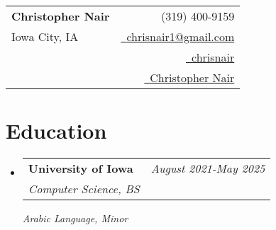 \documentclass[a4paper,11pt]{article}
\makeatletter
\newcommand{\resumeSubheading}[4]{
\vspace{0.5mm}\item
    \begin{tabular*}{0.98\textwidth}[t]{l@{\extracolsep{\fill}}r}
        \textbf{#1} & \textit{\footnotesize{#4}} \\
        \textit{\footnotesize{#3}} &  \footnotesize{#2}\\
    \end{tabular*}
    \vspace{-2.4mm}
}
\newcommand{\resumeSubHeadingListStart}{\begin{itemize}[leftmargin=*,labelsep=0mm]}
\newcommand{\resumeSubHeadingListEnd}{\end{itemize}\vspace{2mm}}
\newcommand{\name}{Christopher Nair} %
\newcommand{\course}{Your Program} %
\newcommand{\phone}{(319) 400-9159} %
\newcommand{\emaila}{chrisnair1@gmail.com} %
\newcommand{\emailb}{} %
\makeatother
\begin{document}
\selectfont


\parbox{2.35cm}{%
}
\parbox{\dimexpr\linewidth-1mm\relax}{
\begin{tabularx}{\linewidth}{L r} \\
  \textbf{\Large \name} & {\raisebox{0.0\height}{\footnotesize \faPhone}\ \phone}\\
  {Iowa City, IA} & \href{mailto:\emaila}{\raisebox{0.0\height}{\footnotesize \faEnvelope}\ {\emaila}} \\
  {} &  \href{https://github.com/chrisnair}{\raisebox{0.0\height}{\footnotesize \faGithub}\ {chrisnair}} \\
  {} & \href{https://www.linkedin.com/in/christopher-nair/}{\raisebox{0.0\height}{\footnotesize \faLinkedin}\ {Christopher Nair}}
\end{tabularx}
}




\section{\textbf{Education}}
  \resumeSubHeadingListStart
    \resumeSubheading
      {University of Iowa}{}%
      {Computer Science, BS} {August 2021-May 2025}
      {\textit{\footnotesize{Arabic Language, Minor}}}
  \resumeSubHeadingListEnd
\vspace{-5.5mm}
%



\end{document}
